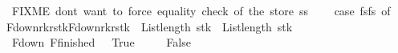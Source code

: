 \begin{isabellebody}
\ \ {\isacharparenleft}{\isacharasterisk}\ FIXME\ don{\isacharprime}t\ want\ to\ force\ equality\ check\ of\ the\ store\ {\isacharparenleft}s{}{\isacharequal}s{}{\isacharparenright}\ {\isacharampersand}\ {\isacharasterisk}{\isacharparenright}\isanewline
\ \ case\ {\isacharparenleft}fs{}{\isacharcomma}fs{}{\isacharparenright}\ of\isanewline
\ \ {\isacharparenleft}F{\isacharunderscore}down{\isacharparenleft}r{}{\isacharcomma}k{\isacharcomma}r{\isacharcomma}stk{\isacharparenright}{\isacharcomma}F{\isacharunderscore}down{\isacharparenleft}r{}{\isacharprime}{\isacharcomma}k{\isacharprime}{\isacharcomma}r{\isacharprime}{\isacharcomma}stk{\isacharprime}{\isacharparenright}{\isacharparenright}\ {\isasymRightarrow}\ {\isacharparenleft}List{\isachardot}length\ stk{\isacharprime}\ {\isacharequal}\ {}{\isacharplus}List{\isachardot}length\ stk{\isacharparenright}\isanewline
\ \ {\isacharbar}\ {\isacharparenleft}F{\isacharunderscore}down\ {\isacharunderscore}{\isacharcomma}F{\isacharunderscore}finished\ {\isacharunderscore}{\isacharparenright}\ {\isasymRightarrow}\ True\isanewline
\ \ {\isacharbar}\ {\isacharunderscore}\ {\isasymRightarrow}\ False{\isacharparenright}{\isachardoublequoteclose}\isanewline
%
\isadelimtheory
\isanewline
%
\endisadelimtheory
%
\isatagtheory
{}\isamarkupfalse%
%
\endisatagtheory
{\isafoldtheory}%
%
\isadelimtheory
%
\endisadelimtheory
\end{isabellebody}%
